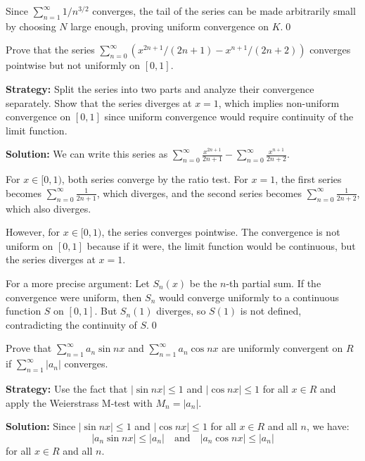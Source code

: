 Since \( \sum_{n=1}^{\infty} 1/n^{3/2} \) converges, the tail of the series can be made arbitrarily small by choosing \( N \) large enough, proving uniform convergence on \( K \).\qed


\begin{problembox}
Prove that the series \(\sum_{n=0}^{\infty} (x^{2n+1}/(2n + 1) - x^{n+1}/(2n + 2))\) converges pointwise but not uniformly on \([0, 1]\).
\end{problembox}

\noindent\textbf{Strategy:} Split the series into two parts and analyze their convergence separately. Show that the series diverges at \( x = 1 \), which implies non-uniform convergence on \([0, 1]\) since uniform convergence would require continuity of the limit function.

\bigskip\noindent\textbf{Solution:} We can write this series as \( \sum_{n=0}^{\infty} \frac{x^{2n+1}}{2n + 1} - \sum_{n=0}^{\infty} \frac{x^{n+1}}{2n + 2} \).

For \( x \in [0, 1) \), both series converge by the ratio test. For \( x = 1 \), the first series becomes \( \sum_{n=0}^{\infty} \frac{1}{2n + 1} \), which diverges, and the second series becomes \( \sum_{n=0}^{\infty} \frac{1}{2n + 2} \), which also diverges.

However, for \( x \in [0, 1) \), the series converges pointwise. The convergence is not uniform on \([0, 1]\) because if it were, the limit function would be continuous, but the series diverges at \( x = 1 \).

For a more precise argument: Let \( S_n(x) \) be the \( n \)-th partial sum. If the convergence were uniform, then \( S_n \) would converge uniformly to a continuous function \( S \) on \([0, 1]\). But \( S_n(1) \) diverges, so \( S(1) \) is not defined, contradicting the continuity of \( S \).\qed


\begin{problembox}
Prove that \(\sum_{n=1}^{\infty} a_n \sin nx \) and \(\sum_{n=1}^{\infty} a_n \cos nx \) are uniformly convergent on \( R \) if \(\sum_{n=1}^{\infty} |a_n| \) converges.
\end{problembox}

\noindent\textbf{Strategy:} Use the fact that \( |\sin nx| \leq 1 \) and \( |\cos nx| \leq 1 \) for all \( x \in R \) and apply the Weierstrass M-test with \( M_n = |a_n| \).

\bigskip\noindent\textbf{Solution:} Since \( |\sin nx| \leq 1 \) and \( |\cos nx| \leq 1 \) for all \( x \in R \) and all \( n \), we have:
\[|a_n \sin nx| \leq |a_n| \quad \text{and} \quad |a_n \cos nx| \leq |a_n|\]
for all \( x \in R \) and all \( n \).

